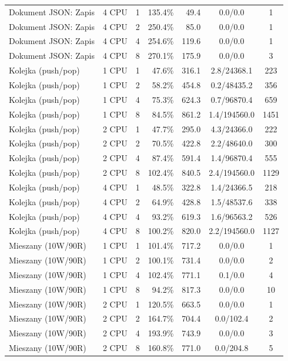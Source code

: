\begin{table}[ht]
{\begin{tabular}{llcrrcc}
Dokument JSON: Zapis & 4 CPU & 1 & 135.4\% & 49.4 & 0.0/0.0 & 1 \\
Dokument JSON: Zapis & 4 CPU & 2 & 250.4\% & 85.0 & 0.0/0.0 & 1 \\
Dokument JSON: Zapis & 4 CPU & 4 & 254.6\% & 119.6 & 0.0/0.0 & 1 \\
Dokument JSON: Zapis & 4 CPU & 8 & 270.1\% & 175.9 & 0.0/0.0 & 3 \\
Kolejka (push/pop) & 1 CPU & 1 & 47.6\% & 316.1 & 2.8/24368.1 & 223 \\
Kolejka (push/pop) & 1 CPU & 2 & 58.2\% & 454.8 & 0.2/48435.2 & 356 \\
Kolejka (push/pop) & 1 CPU & 4 & 75.3\% & 624.3 & 0.7/96870.4 & 659 \\
Kolejka (push/pop) & 1 CPU & 8 & 84.5\% & 861.2 & 1.4/194560.0 & 1451 \\
Kolejka (push/pop) & 2 CPU & 1 & 47.7\% & 295.0 & 4.3/24366.0 & 222 \\
Kolejka (push/pop) & 2 CPU & 2 & 70.5\% & 422.8 & 2.2/48640.0 & 300 \\
Kolejka (push/pop) & 2 CPU & 4 & 87.4\% & 591.4 & 1.4/96870.4 & 555 \\
Kolejka (push/pop) & 2 CPU & 8 & 102.4\% & 840.5 & 2.4/194560.0 & 1129 \\
Kolejka (push/pop) & 4 CPU & 1 & 48.5\% & 322.8 & 1.4/24366.5 & 218 \\
Kolejka (push/pop) & 4 CPU & 2 & 64.9\% & 428.8 & 1.5/48537.6 & 338 \\
Kolejka (push/pop) & 4 CPU & 4 & 93.2\% & 619.3 & 1.6/96563.2 & 526 \\
Kolejka (push/pop) & 4 CPU & 8 & 100.2\% & 820.0 & 2.2/194560.0 & 1127 \\
Mieszany (10W/90R) & 1 CPU & 1 & 101.4\% & 717.2 & 0.0/0.0 & 1 \\
Mieszany (10W/90R) & 1 CPU & 2 & 100.1\% & 731.4 & 0.0/0.0 & 2 \\
Mieszany (10W/90R) & 1 CPU & 4 & 102.4\% & 771.1 & 0.1/0.0 & 4 \\
Mieszany (10W/90R) & 1 CPU & 8 & 94.2\% & 817.3 & 0.0/0.0 & 10 \\
Mieszany (10W/90R) & 2 CPU & 1 & 120.5\% & 663.5 & 0.0/0.0 & 1 \\
Mieszany (10W/90R) & 2 CPU & 2 & 164.7\% & 704.4 & 0.0/102.4 & 2 \\
Mieszany (10W/90R) & 2 CPU & 4 & 193.9\% & 743.9 & 0.0/0.0 & 3 \\
Mieszany (10W/90R) & 2 CPU & 8 & 160.8\% & 771.0 & 0.0/204.8 & 5 \\

\end{tabular}}
\end{table}
